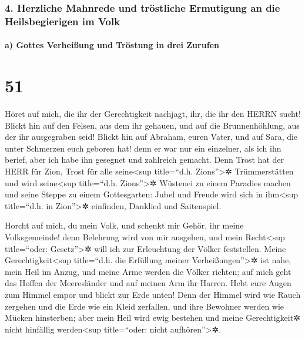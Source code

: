 \hypertarget{herzliche-mahnrede-und-truxf6stliche-ermutigung-an-die-heilsbegierigen-im-volk}{%
\subsubsection{4. Herzliche Mahnrede und tröstliche Ermutigung an die
Heilsbegierigen im
Volk}\label{herzliche-mahnrede-und-truxf6stliche-ermutigung-an-die-heilsbegierigen-im-volk}}

\hypertarget{a-gottes-verheiuxdfung-und-truxf6stung-in-drei-zurufen}{%
\paragraph{a) Gottes Verheißung und Tröstung in drei
Zurufen}\label{a-gottes-verheiuxdfung-und-truxf6stung-in-drei-zurufen}}

\hypertarget{section-50}{%
\section{51}\label{section-50}}

Höret auf mich, die ihr der Gerechtigkeit nachjagt, ihr,
die ihr den HERRN sucht! Blickt hin auf den Felsen, aus dem ihr gehauen,
und auf die Brunnenhöhlung, aus der ihr ausgegraben seid!
Blickt hin auf Abraham, euren Vater, und auf Sara, die
unter Schmerzen euch geboren hat! denn er war nur ein einzelner, als ich
ihn berief, aber ich habe ihn gesegnet und zahlreich gemacht.
Denn Trost hat der HERR für Zion, Trost für alle
seine\textless sup title=``d.h. Zions''\textgreater✲ Trümmerstätten und
wird seine\textless sup title=``d.h. Zions''\textgreater✲ Wüstenei zu
einem Paradies machen und seine Steppe zu einem Gottesgarten: Jubel und
Freude wird sich in ihm\textless sup title=``d.h. in Zion''\textgreater✲
einfinden, Danklied und Saitenspiel.

Horcht auf mich, du mein Volk, und schenkt mir Gehör, ihr
meine Volksgemeinde! denn Belehrung wird von mir ausgehen, und mein
Recht\textless sup title=``oder: Gesetz''\textgreater✲ will ich zur
Erleuchtung der Völker feststellen. Meine
Gerechtigkeit\textless sup title=``d.h. die Erfüllung meiner
Verheißungen''\textgreater✲ ist nahe, mein Heil im Anzug, und meine Arme
werden die Völker richten; auf mich geht das Hoffen der Meeresländer und
auf meinen Arm ihr Harren. Hebt eure Augen zum Himmel
empor und blickt zur Erde unten! Denn der Himmel wird wie Rauch zergehen
und die Erde wie ein Kleid zerfallen, und ihre Bewohner werden wie
Mücken hinsterben; aber mein Heil wird ewig bestehen und meine
Gerechtigkeit✲ nicht hinfällig werden\textless sup title=``oder: nicht
aufhören''\textgreater✲.

